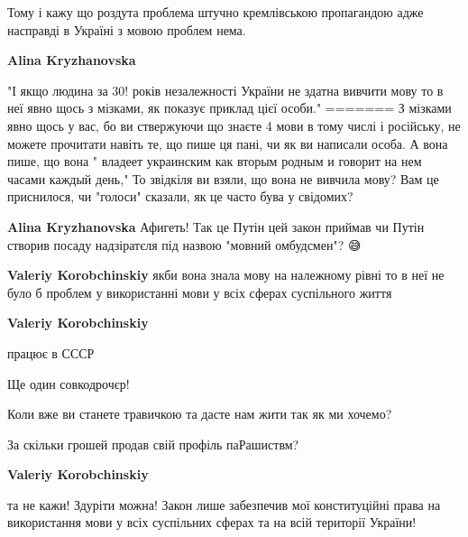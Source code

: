 \begin{itemize}
\begin{itemize}
Тому і кажу що роздута проблема штучно кремлівською пропагандою адже насправді
в Україні з мовою проблем нема.



\textbf{Alina Kryzhanovska} 

"І якщо людина за 30! років незалежності України не
здатна вивчити мову то в неї явно щось з мізками, як показує приклад цієї
особи." ======= З мізками явно щось у вас, бо ви ствержуючи що знаєте 4 мови в
тому числі і російську, не можете прочитати навіть те, що пише ця пані, чи як
ви написали особа. А вона пише, що вона " владеет украинским как вторым родным
и говорит на нем часами каждый день," То звідкіля ви взяли, що вона не вивчила
мову? Вам це приснилося, чи "голоси" сказали, як це часто бува у свідомих?



\textbf{Alina Kryzhanovska} Афигеть! Так це Путін цей закон приймав чи Путін
створив посаду надзіратєля під назвою "мовний омбудсмен"? 😅


\textbf{Valeriy Korobchinskiy} якби вона знала мову на належному рівні то в неї
не було б проблем у використанні мови у всіх сферах суспільного життя



\textbf{Valeriy Korobchinskiy} 

працює в СССР 🤣🤣🤣

Ще один совкодрочєр!

Коли вже ви станете травичкою та дасте нам жити так як ми хочемо?

За скільки грошей продав свій профіль паРашиствм?



\textbf{Valeriy Korobchinskiy} 

та не кажи! Здуріти можна! Закон лише забезпечив мої конституційні права на
використання мови у всіх суспільних сферах та на всій території України!


\end{itemize}
\end{itemize}
